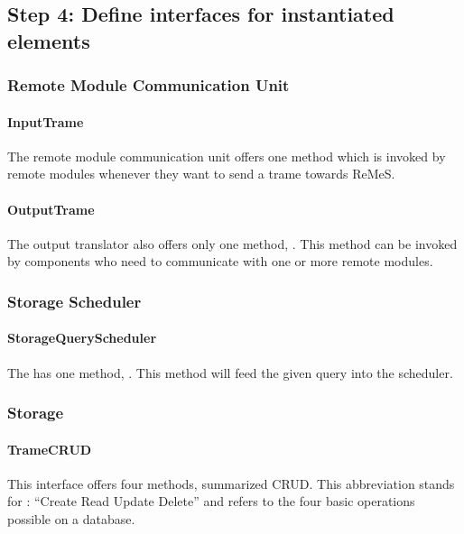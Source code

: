 \subsection{Step 4: Define interfaces for instantiated elements}
\label{add:it1/interfaces}

\subsubsection{Remote Module Communication Unit}

\paragraph{InputTrame} %

\npar The remote module communication unit offers one method
 which is invoked by remote modules whenever they want
to send a trame towards ReMeS.

\paragraph{OutputTrame}

\npar The output translator also offers only one method, .
This method can be invoked by components who need to communicate with one or
more remote modules.

\subsubsection{Storage Scheduler}

\paragraph{StorageQueryScheduler}

\npar The  has one method,
. This method will feed the given query into the
scheduler. 

\subsubsection{Storage}

\paragraph{TrameCRUD}

\npar This interface offers four methods, summarized CRUD. This abbreviation
stands for : ``Create Read Update Delete'' and refers to the four basic
operations possible on a database.
 
